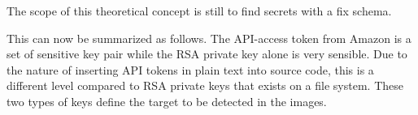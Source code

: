 The scope of this theoretical concept is still to find secrets with a fix schema.

This can now be summarized as follows. The API-access token from Amazon is a set of sensitive key pair while the RSA private key alone is very sensible. 
Due to the nature of inserting API tokens in plain text into source code, this is a different level compared to RSA private keys that exists on a file system.
These two types of keys define the target to be detected in the images.
